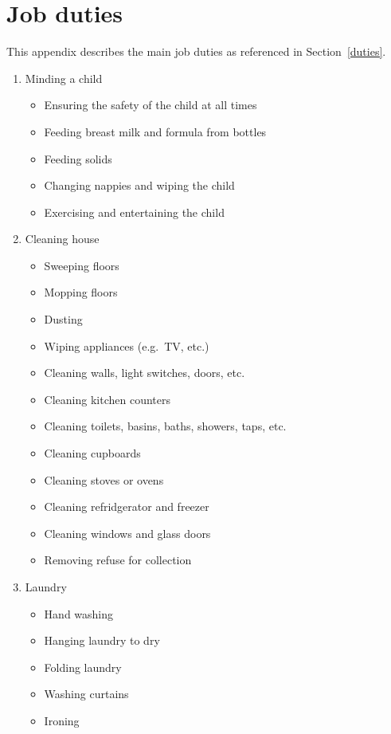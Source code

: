 \documentclass[a4paper,11pt]{article}
\begin{document}
\pagebreak %

\appendix

\section{Job duties}
\label{job-duties}

This appendix describes the main job duties as referenced in
Section~\ref{duties}.

\begin{enumerate}
  \item Minding a child
    \begin{itemize}
      \item Ensuring the safety of the child at all times
      \item Feeding breast milk and formula from bottles
      \item Feeding solids
      \item Changing nappies and wiping the child
      \item Exercising and entertaining the child
    \end{itemize}
  \item Cleaning house
    \begin{itemize}
      \item Sweeping floors
      \item Mopping floors
      \item Dusting
      \item Wiping appliances (e.g.\ TV, etc.)
      \item Cleaning walls, light switches, doors, etc.
      \item Cleaning kitchen counters
      \item Cleaning toilets, basins, baths, showers, taps, etc.
      \item Cleaning cupboards
      \item Cleaning stoves or ovens
      \item Cleaning refridgerator and freezer
      \item Cleaning windows and glass doors
      \item Removing refuse for collection
    \end{itemize}
  \item Laundry
    \begin{itemize}
      \item Hand washing
      \item Hanging laundry to dry
      \item Folding laundry
      \item Washing curtains
      \item Ironing
    \end{itemize}
\end{enumerate}
\end{document}
